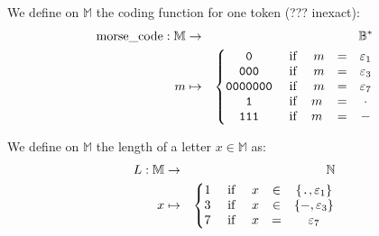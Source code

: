 \documentclass[twocolumn,pre,floats,aps,amsmath,amssymb]{revtex4}
\newenvironment{definition}[1][D\'efinition.]{\begin{trivlist}
\item[\hskip \labelsep {\bfseries #1}]}{\end{trivlist}}
\begin{document}
\begin{definition}
  We define on $\mathbb{M}$ the coding function for one token (??? inexact):
  \begin{eqnarray*}
    \operatorname{morse\_code} : \mathbb{M} &\rightarrow& \mathbb{B^{*}}\\
                 m &\mapsto&
                 \left\{\begin{matrix}
                        \texttt{0} \ &\textup{if}& \ m &=& \varepsilon_1 \\ 
                        \texttt{000} \ &\textup{if}& \ m &=& \varepsilon_3 \\
                        \texttt{0000000} \ &\textup{if}& \ m &=& \varepsilon_7 \\
                        \texttt{1} \ &\textup{if}& m &=& \cdot\\
                        \texttt{111} \ &\textup{if}& m &=& -
                        \end{matrix}\right.
  \end{eqnarray*}
\end{definition}

\begin{definition}
  We define on $\mathbb{M}$ the length of a letter $x \in \mathbb{M}$ as:
\begin{eqnarray*}
  L : \mathbb{M} &\rightarrow& \mathbb{N}\\
              x  &\mapsto&
                 \left\{\begin{matrix}
                 1 \ &\textup{if }& x &\in& \left \{ \texttt{.}, \varepsilon_1 \right \} \\
                 3 \ &\textup{if }& x &\in& \left \{ -, \varepsilon_3 \right \} \\ 
                 7 \ &\textup{if }& x &=& \varepsilon_7
              \end{matrix}\right.
\end{eqnarray*}
\end{definition}
\end{document}
